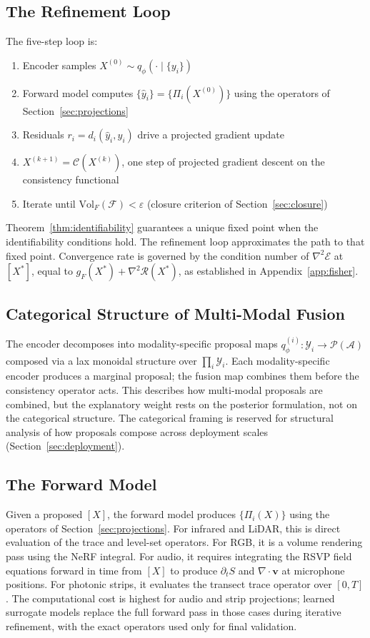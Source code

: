 \documentclass[12pt, oneside]{article}
\begin{document}
\subsection{The Refinement Loop}

The five-step loop is:
\begin{enumerate}
\item Encoder samples $X^{(0)} \sim q_\phi(\cdot \mid \{y_i\})$
\item Forward model computes $\{\hat{y}_i\} = \{\Pi_i(X^{(0)})\}$ using the operators
  of Section~\ref{sec:projections}
\item Residuals $r_i = d_i(\hat{y}_i, y_i)$ drive a projected gradient update
\item $X^{(k+1)} = \mathcal{C}(X^{(k)})$, one step of projected gradient descent on
  the consistency functional
\item Iterate until $\mathrm{Vol}_F(\mathcal{F}) < \varepsilon$ (closure criterion of
  Section~\ref{sec:closure})
\end{enumerate}
Theorem~\ref{thm:identifiability} guarantees a unique fixed point when the identifiability
conditions hold. The refinement loop approximates the path to that fixed point. Convergence
rate is governed by the condition number of $\nabla^2\mathcal{E}$ at $[X^*]$, equal to
$g_F(X^*) + \nabla^2\mathcal{R}(X^*)$, as established in Appendix~\ref{app:fisher}.

\subsection{Categorical Structure of Multi-Modal Fusion}

The encoder decomposes into modality-specific proposal maps
$q_\phi^{(i)} : \mathcal{Y}_i \to \mathcal{P}(\mathcal{A})$ composed via a lax monoidal
structure over $\prod_i \mathcal{Y}_i$. Each modality-specific encoder produces a marginal
proposal; the fusion map combines them before the consistency operator acts. This describes
how multi-modal proposals are combined, but the explanatory weight rests on the posterior
formulation, not on the categorical structure. The categorical framing is reserved for
structural analysis of how proposals compose across deployment scales
(Section~\ref{sec:deployment}).

\subsection{The Forward Model}

Given a proposed $[X]$, the forward model produces $\{\Pi_i(X)\}$ using the operators of
Section~\ref{sec:projections}. For infrared and LiDAR, this is direct evaluation of the
trace and level-set operators. For RGB, it is a volume rendering pass using the NeRF
integral. For audio, it requires integrating the RSVP field equations forward in time from
$[X]$ to produce $\partial_t S$ and $\nabla\cdot\mathbf{v}$ at microphone positions. For
photonic strips, it evaluates the transect trace operator over $[0,T]$. The computational
cost is highest for audio and strip projections; learned surrogate models replace the full
forward pass in those cases during iterative refinement, with the exact operators used only
for final validation.
\end{document}
